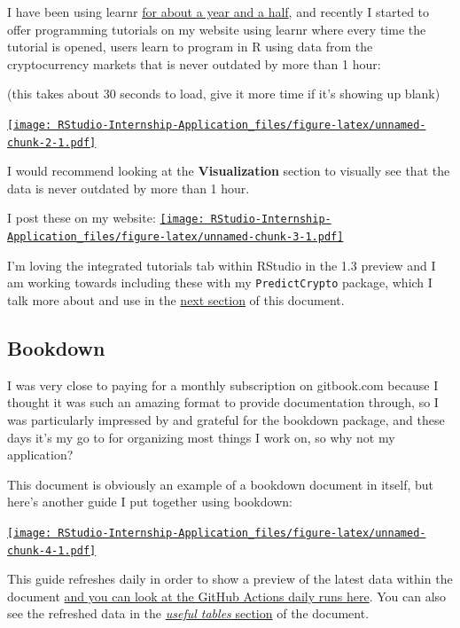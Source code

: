 \documentclass[
]{book}
\begin{document}
I have been using learnr \href{https://github.com/ries9112/R-Tutorial}{for about a year and a half}, and recently I started to offer programming tutorials on my website using learnr where every time the tutorial is opened, users learn to program in R using data from the cryptocurrency markets that is never outdated by more than 1 hour:

(this takes about 30 seconds to load, give it more time if it's showing up blank)

\href{https://predictcrypto.shinyapps.io/R_Basics/}{\texttt{[image: RStudio-Internship-Application\_files/figure-latex/unnamed-chunk-2-1.pdf]}}

I would recommend looking at the \textbf{Visualization} section to visually see that the data is never outdated by more than 1 hour.

I post these on my website:
\href{https://predictcrypto.com/tutorials}{\texttt{[image: RStudio-Internship-Application\_files/figure-latex/unnamed-chunk-3-1.pdf]}}

I'm loving the integrated tutorials tab within RStudio in the 1.3 preview and I am working towards including these with my \texttt{PredictCrypto} package, which I talk more about and use in the \protect\hyperlink{ideal-projects}{next section} of this document.

\hypertarget{bookdown}{%
\subsection{Bookdown}\label{bookdown}}

I was very close to paying for a monthly subscription on gitbook.com because I thought it was such an amazing format to provide documentation through, so I was particularly impressed by and grateful for the bookdown \citep{R-bookdown} package, and these days it's my go to for organizing most things I work on, so why not my application?

This document is obviously an example of a bookdown document in itself, but here's another guide I put together using bookdown:

\href{https://predictcryptodb-quickstart.com/}{\texttt{[image: RStudio-Internship-Application\_files/figure-latex/unnamed-chunk-4-1.pdf]}}

This guide refreshes daily in order to show a preview of the latest data within the document \href{https://github.com/ries9112/PredictCryptoDB/actions}{and you can look at the GitHub Actions daily runs here}. You can also see the refreshed data in the \href{https://predictcryptodb-quickstart.com/useful-tables.html}{\emph{useful tables} section} of the document.
\end{document}

